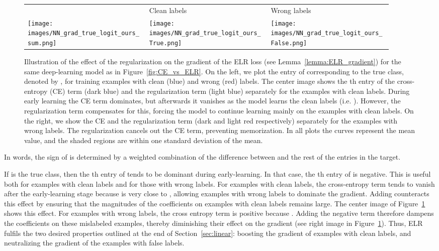 \documentclass{article}
\newcommand{\1}{\mathds{1}}
\begin{document}
\begin{figure}[t]
\hspace{-0.4cm}
    \begin{tabular}{>{\centering\arraybackslash}m{0.31\linewidth} >{\centering\arraybackslash}m{0.31\linewidth} >{\centering\arraybackslash}m{0.31\linewidth}}
    \quad\quad & \quad\quad Clean labels & \quad\quad Wrong labels  \\
      \texttt{[image: images/NN\_grad\_true\_logit\_ours\_sum.png]}
      &
     \texttt{[image: images/NN\_grad\_true\_logit\_ours\_True.png]}&
     \texttt{[image: images/NN\_grad\_true\_logit\_ours\_False.png]}
    \end{tabular}
    \caption{
    Illustration of the effect of the regularization on the gradient of the ELR loss (see Lemma~\ref{lemma:ELR_gradient}) for the same deep-learning model as in Figure~\ref{fig:CE_vs_ELR}. On the left, we plot the entry of  corresponding to the true class, denoted by , for training examples with clean (blue) and wrong (red) labels. The center image shows the th entry of the cross-entropy (CE) term  (dark blue) and the regularization term  (light blue) separately for the examples with clean labels. During early learning the CE term dominates, but afterwards it vanishes as the model learns the clean labels (i.e. ). However, the regularization term compensates for this, forcing the model to continue learning mainly on the examples with clean labels. On the right, we show the CE and the regularization term (dark and light red respectively) separately for the examples with wrong labels. The regularization cancels out the CE term, preventing memorization. In all plots the curves represent the mean value, and the shaded regions are within one standard deviation of the mean.
    }
    \label{fig:Gradient_simple}
\end{figure}

In words, the sign of  is determined by a weighted combination of the difference between  and the rest of the entries in the target. 

If  is the true class, then the th entry of  tends to be dominant during early-learning. In that case, the th entry of  is negative.
This is useful both for examples with clean labels and for those with wrong labels.
For examples with clean labels, the cross-entropy term  tends to vanish after the early-learning stage because  is very close to , allowing examples with wrong labels to dominate the gradient. Adding  counteracts this effect by ensuring that the magnitudes of the coefficients on examples with clean labels remains large. The center image of Figure~\ref{fig:Gradient_simple} shows this effect. For examples with wrong labels, the cross entropy term  is positive because . Adding the negative term  therefore dampens the coefficients on these mislabeled examples, thereby diminishing their effect on the gradient (see right image in Figure~\ref{fig:Gradient_simple}). Thus, ELR fulfils the two desired properties outlined at the end of Section~\ref{sec:linear}: boosting the gradient of examples with clean labels, and neutralizing the gradient of the examples with false labels.  
\end{document}
